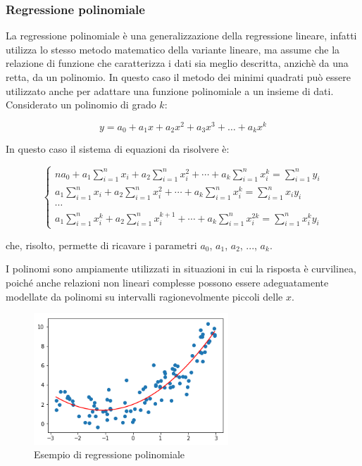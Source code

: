 \subsubsection{Regressione polinomiale}\label{sssec:regressione-polinomiale}
La regressione polinomiale è una generalizzazione della regressione lineare, infatti utilizza lo stesso metodo matematico della variante lineare, ma assume che la relazione di funzione che caratterizza i dati sia meglio descritta, anzichè da una retta, da un polinomio. In questo caso il metodo dei minimi quadrati può essere utilizzato anche per adattare una funzione polinomiale a un insieme di dati. Considerato un polinomio di grado $k$:

$$y=a_{0}+a_{1} x+a_{2} x^{2}+a_{3} x^{3}+\ldots+a_{k} x^{k}$$\smallskip

In questo caso il sistema di equazioni da risolvere è:

$$\left\{\begin{array}{l}
n a_{0}+a_{1} \sum_{i=1}^{n} x_{i}+a_{2} \sum_{i=1}^{n} x_{i}^{2}+\cdots+a_{k} \sum_{i=1}^{n} x_{i}^{k}=\sum_{i=1}^{n} y_{i} \\
a_{1} \sum_{i=1}^{n} x_{i}+a_{2} \sum_{i=1}^{n} x_{i}^{2}+\cdots+a_{k} \sum_{i=1}^{n} x_{i}^{k}=\sum_{i=1}^{n} x_{i} y_{i} \\
\cdots \\
a_{1} \sum_{i=1}^{n} x_{i}^{k}+a_{2} \sum_{i=1}^{n} x_{i}^{k+1}+\cdots+a_{k} \sum_{i=1}^{n} x_{i}^{2 k}=\sum_{i=1}^{n} x_{i}^{k} y_{i}
\end{array}\right.$$\smallskip

che, risolto, permette di ricavare i parametri $a_0$, $a_1$, $a_2$, ..., $a_k$.

I polinomi sono ampiamente utilizzati in situazioni in cui la risposta è curvilinea, poiché anche relazioni non lineari complesse possono essere adeguatamente modellate da polinomi su intervalli ragionevolmente piccoli delle $x$.

\begin{figure}[H]
\centering
\includegraphics[width=0.65\textwidth,height=\textheight,keepaspectratio]{img/poly_reg_example.png}
\caption{Esempio di regressione polinomiale}
\label{fig:poly_reg}
\end{figure}

